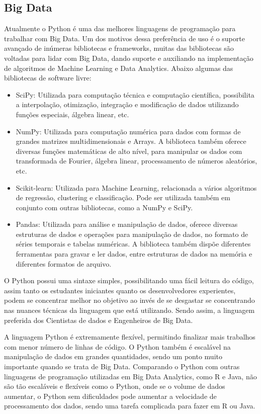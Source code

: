         \subsection{Big Data}
        Atualmente o Python é uma das melhores linguagens de programação para trabalhar com Big Data. Um dos motivos dessa preferência de uso é o suporte avançado de inúmeras bibliotecas e frameworks, muitas das bibliotecas são voltadas para lidar com Big Data, dando suporte e auxiliando na implementação de algoritmos de Machine Learning e Data Analytics. Abaixo algumas das bibliotecas de software livre:
        \begin{itemize}
        	\item SciPy: Utilizada para computação técnica e computação científica, possibilita a interpolação, otimização, integração e modificação de dados utilizando funções especiais, álgebra linear, etc.
        	
        	\item NumPy: Utilizada para computação numérica para dados com formas de grandes matrizes multidimensionais e Arrays. A biblioteca também oferece diversas funções matemáticas de alto nível, para manipular os dados com transformada de Fourier, álgebra linear, processamento de números aleatórios, etc.
        	
        	\item Scikit-learn: Utilizada para Machine Learning, relacionada a vários algoritmos de regressão, clustering e classificação. Pode ser utilizada também em conjunto com outras bibliotecas, como a NumPy e SciPy.
        	
        	\item Pandas: Utilizada para análise e manipulação de dados, oferece diversas estruturas de dados e operações para manipulação de dados, no formato de séries temporais e tabelas numéricas. A biblioteca também dispõe diferentes ferramentas para gravar e ler dados, entre estruturas de dados na memória e diferentes formatos de arquivo.
        \end{itemize}
        
        O Python possui uma sintaxe simples, possibilitando uma fácil leitura do código, assim tanto os estudantes iniciantes quanto os desenvolvedores experientes, podem se concentrar melhor no objetivo ao invés de se desgastar se concentrando nas nuances técnicas da linguagem que está utilizando. Sendo assim, a linguagem preferida dos Cientistas de dados e Engenheiros de Big Data. 
        
        A linguagem Python é extremamente flexível, permitindo finalizar mais trabalhos com menor número de linhas de código. O Python também é escalável na manipulação de dados em grandes quantidades, sendo um ponto muito importante quando se trata de Big Data. Comparando o Python com outras linguagens de programação utilizadas em Big Data Analytics, como R e Java, não são tão escaláveis e flexíveis como o Python, onde se o volume de dados aumentar, o Python sem dificuldades pode aumentar a velocidade de processamento dos dados, sendo uma tarefa complicada para fazer em R ou Java. \cite{McKinney2019}

